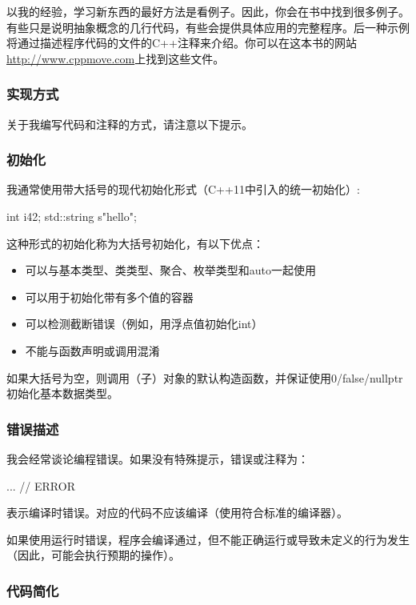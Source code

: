 以我的经验，学习新东西的最好方法是看例子。因此，你会在书中找到很多例子。有些只是说明抽象概念的几行代码，有些会提供具体应用的完整程序。后一种示例将通过描述程序代码的文件的C++注释来介绍。你可以在这本书的网站\url{http://www.cppmove.com}上找到这些文件。

\subsubsection{实现方式}

关于我编写代码和注释的方式，请注意以下提示。

\subsubsection{初始化}

我通常使用带大括号的现代初始化形式（C++11中引入的统一初始化）:
\begin{cppcode}
int i{42};
std::string s{"hello"};
\end{cppcode}

这种形式的初始化称为大括号初始化，有以下优点：
\begin{itemize}
	\item 可以与基本类型、类类型、聚合、枚举类型和auto一起使用
	\item 可以用于初始化带有多个值的容器
	\item 可以检测截断错误（例如，用浮点值初始化int）
	\item 不能与函数声明或调用混淆
\end{itemize}

如果大括号为空，则调用（子）对象的默认构造函数，并保证使用0/false/nullptr初始化基本数据类型。

\subsubsection{错误描述}

我会经常谈论编程错误。如果没有特殊提示，错误或注释为：

\begin{cppcode}
... // ERROR
\end{cppcode}

表示编译时错误。对应的代码不应该编译（使用符合标准的编译器）。

如果使用运行时错误，程序会编译通过，但不能正确运行或导致未定义的行为发生（因此，可能会执行预期的操作）。

\subsubsection{代码简化}

